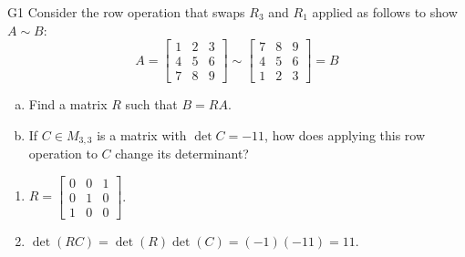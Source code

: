 \begin{problem}{G1}
Consider the row operation that swaps \(R_3\) and \(R_1\) applied as follows to show
\(A\sim B\):
\[
A=\begin{bmatrix}1&2&3\\4&5&6\\7&8&9\end{bmatrix}
  \sim
\begin{bmatrix}7&8&9\\4&5&6\\1&2&3\end{bmatrix}=B
\]
\begin{enumerate}[(a)]
\item Find a matrix \(R\) such that \(B=RA\).
\item If \(C \in M_{3,3}\) is a matrix with \(\det C = -11\), how does applying this row operation to \(C\) change its determinant?
\end{enumerate}
\end{problem}
\begin{solution}
\begin{enumerate}
\item \(R= \begin{bmatrix} 0 & 0 & 1 \\ 0 & 1 & 0 \\ 1 & 0 & 0 \end{bmatrix}\).
\item \(\det(RC)= \det(R)\det(C)=(-1)(-11)=11\).
\end{enumerate}
\end{solution}
